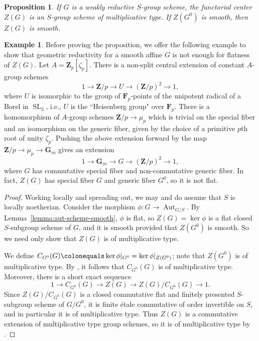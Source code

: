 \documentclass[11pt, letterpaper,english]{amsart}
\theoremstyle{plain}
\newtheorem{prop}[lem]{Proposition}
\theoremstyle{definition}
\newtheorem{example}[lem]{Example}
\numberwithin{equation}{section}
\numberwithin{lem}{section}
\newcommand{\mathfont}{\mathbf}
\newcommand{\bF}{\mathfont{F}}
\newcommand{\bG}{\mathfont{G}}
\newcommand{\bZ}{\mathfont{Z}}
\DeclareMathOperator{\Aut}{Aut}
\DeclareMathOperator{\SL}{SL}
\begin{document}
\begin{prop}\label{prop:center}
If $G$ is a weakly reductive $S$-group scheme, the functorial center $Z(G)$ is an $S$-group scheme of multiplicative type. If $Z(G^0)$ is smooth, then $Z(G)$ is smooth.
\end{prop}

\begin{example}\label{example:p-is-bad}
Before proving the proposition, we offer the following example to show that geometric reductivity for a smooth affine $G$ is not enough for flatness of $Z(G)$. Let $A = \bZ_p[\zeta_p]$. There is a non-split central extension of constant $A$-group schemes
\[
1 \to \bZ/p \to U \to (\bZ/p)^2 \to 1,
\]
where $U$ is isomorphic to the group of $\bF_p$-points of the unipotent radical of a Borel in $\SL_3$, i.e., $U$ is the ``Heisenberg group" over $\bF_p$. There is a homomorphism of $A$-group schemes $\bZ/p \to \mu_p$ which is trivial on the special fiber and an isomorphism on the generic fiber, given by the choice of a primitive $p$th root of unity $\zeta_p$. Pushing the above extension forward by the map $\bZ/p \to \mu_p \to \bG_m$ gives an extension
\[
1 \to \bG_m \to G \to (\bZ/p)^2 \to 1,
\]
where $G$ has commutative special fiber and non-commutative generic fiber. In fact, $Z(G)$ has special fiber $G$ and generic fiber $G^0$, so it is not flat.
\end{example}

\begin{proof}
Working locally and spreading out, we may and do assume that $S$ is locally noetherian. Consider the morphism $\phi: G \to \Aut_{G/S}$. By Lemma~\ref{lemma:aut-scheme-smooth}, $\phi$ is flat, so $Z(G) = \ker \phi$ is a flat closed $S$-subgroup scheme of $G$, and it is smooth provided that $Z(G^0)$ is smooth. So we need only show that $Z(G)$ is of multiplicative type. 

We define $C_{G^0}(G) \colonequals \ker \phi|_{G^0} = \ker \phi|_{Z(G^0)}$; note that $Z(G^0)$ is of multiplicative type. By \cite[Exp.\ IX, Th\'eor\`eme 6.8]{sga3}, it follows that $C_{G^0}(G)$ is of multiplicative type. Moreover, there is a short exact sequence
\[
1 \to C_{G^0}(G) \to Z(G) \to Z(G)/C_{G^0}(G) \to 1.
\]
Since $Z(G)/C_{G^0}(G)$ is a closed commutative flat and finitely presented $S$-subgroup scheme of $G/G^0$, it is finite \'{e}tale commutative of order invertible on $S$, and in particular it is of multiplicative type. Thus $Z(G)$ is a commutative extension of multiplicative type group schemes, so it is of multiplicative type by \cite[Exp.\ XVII, Prop.\ 7.1.1]{sga3}.
\end{proof}
\end{document}
